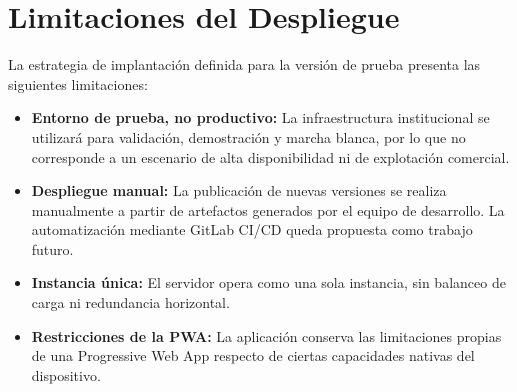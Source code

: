 \section{Limitaciones del Despliegue}

La estrategia de implantación definida para la versión de prueba presenta las siguientes limitaciones:

\begin{itemize}
    \item \textbf{Entorno de prueba, no productivo:} La infraestructura institucional se utilizará para validación, demostración y marcha blanca, por lo que no corresponde a un escenario de alta disponibilidad ni de explotación comercial.

    \item \textbf{Despliegue manual:} La publicación de nuevas versiones se realiza manualmente a partir de artefactos generados por el equipo de desarrollo. La automatización mediante GitLab CI/CD queda propuesta como trabajo futuro.

    \item \textbf{Instancia única:} El servidor opera como una sola instancia, sin balanceo de carga ni redundancia horizontal.

    \item \textbf{Restricciones de la PWA:} La aplicación conserva las limitaciones propias de una Progressive Web App respecto de ciertas capacidades nativas del dispositivo.
\end{itemize}
